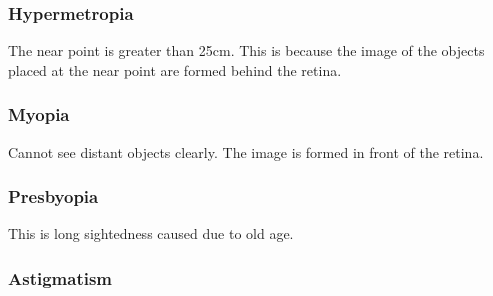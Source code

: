 \documentclass[12pt]{book}
\begin{document}
\subsubsection{Hypermetropia}
The near point is greater than 25cm. This is because the image of the objects placed at the near point are formed behind the retina.
\subsubsection{Myopia}
Cannot see distant objects clearly. The image is formed in front of the retina.
\subsubsection{Presbyopia}
This is long sightedness caused due to old age.
\subsubsection{Astigmatism}
\end{document}
